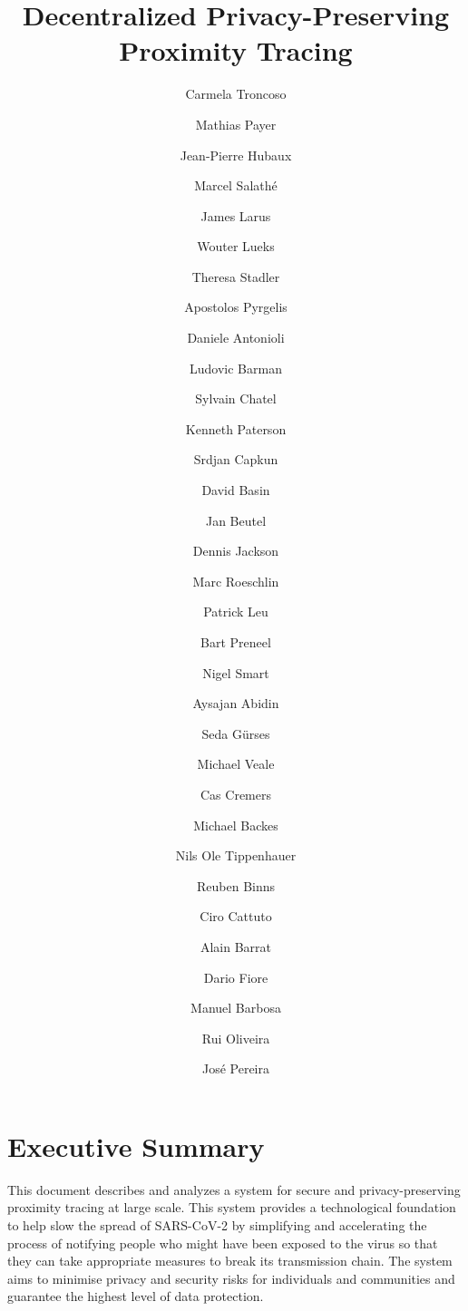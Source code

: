 \documentclass{article}
\begin{document}
\title{Decentralized Privacy-Preserving Proximity Tracing}

\author[1]{Carmela Troncoso}
\author[1]{Mathias Payer}
\author[1]{Jean-Pierre Hubaux}
\author[1]{Marcel Salath\'e}
\author[1]{James Larus}
\author[1]{Wouter Lueks}
\author[1]{Theresa Stadler}
\author[1]{Apostolos Pyrgelis}
\author[1]{Daniele Antonioli}
\author[1]{Ludovic Barman}
\author[1]{Sylvain Chatel}
\author[2]{Kenneth Paterson}
\author[2]{Srdjan Capkun}
\author[2]{David Basin}
\author[2]{Jan Beutel}
\author[2]{Dennis Jackson}
\author[2]{Marc Roeschlin}
\author[2]{Patrick Leu}
\author[3]{Bart Preneel}
\author[3]{Nigel Smart}
\author[3]{Aysajan Abidin}
\author[4]{Seda G\"urses}
\author[5]{Michael Veale}
\author[6]{Cas Cremers}
\author[6]{Michael Backes}
\author[6]{Nils Ole Tippenhauer}
\author[7]{Reuben Binns}
\author[8]{Ciro Cattuto}
\author[9]{Alain Barrat}
\author[10]{Dario Fiore}
\author[11]{Manuel Barbosa}
\author[11]{Rui Oliveira}
\author[11]{Jos\'e Pereira}



  \maketitle

\newpage
\section*{Executive Summary}\label{executive-summary}

This document describes and analyzes a system for secure and
privacy-preserving proximity tracing at large scale. This system
provides a technological foundation to help slow the spread of
SARS-CoV-2 by simplifying and accelerating the process of notifying
people who might have been exposed to the virus so that they can take
appropriate measures to break its transmission chain. The system aims to
minimise privacy and security risks for individuals and communities and
guarantee the highest level of data protection.
\end{document}
